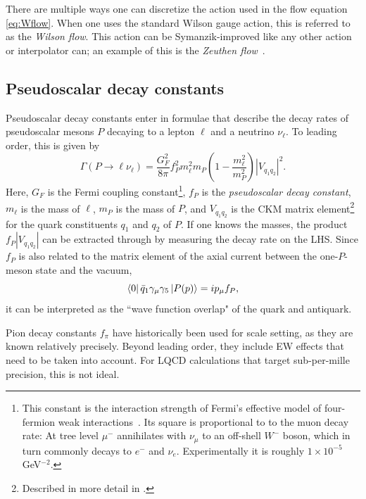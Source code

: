 There are multiple ways one can discretize the action used in the flow equation
\eqref{eq:Wflow}. When one uses the standard Wilson gauge action, this is referred
to as the {\it Wilson flow}. This action can be 
Symanzik-improved like any other action or interpolator can; an example of this is 
the {\it Zeuthen flow}~\cite{Ramos:2015baa}.

\subsection{Pseudoscalar decay constants}

Pseudoscalar decay constants enter in formulae that describe the decay rates 
of pseudoscalar mesons $P$ decaying to a lepton $\ell$ and a neutrino $\nu_\ell$. 
To leading order, this is given by
\begin{equation}\label{eq:decayconstant}
\Gamma(P\to\ell\nu_\ell)=\frac{G_F^2}{8\pi}f_P^2m_\ell^2m_P
\left(1-\frac{m_\ell^2}{m_P^2}\right)|V_{q_1q_2}|^2.
\end{equation}
Here, $G_F$ is the Fermi coupling constant\footnote{This constant is the
interaction strength of Fermi's effective model of four-fermion weak
interactions~\cite{fermi_tentativo_1934}. Its square is proportional to
to the muon decay rate: At tree level $\mu^-$ annihilates with $\nu_\mu$
to an off-shell $W^-$ boson, which in turn commonly decays to
$e^-$ and $\nu_e$. Experimentally it is roughly $1\times10^{-5}$ GeV$^{-2}$.},
$f_P$ is the {\it pseudoscalar decay constant},
$m_\ell$ is the mass of $\ell$, $m_P$ is the mass of $P$,
and $V_{q_1q_2}$ is the CKM matrix element\footnote{Described in
more detail in .} for the quark constituents
$q_1$ and $q_2$ of $P$. If one knows the masses, the product
$f_P|V_{q_1q_2}|$ can be extracted through  by
measuring the decay rate on the LHS.
Since $f_P$ is also related to the matrix element of the
axial current between the one-$P$-meson state and the vacuum,
\begin{equation}
\bra{0}\bar{q}_1\gamma_\mu\gamma_5\ket{P(p)}=ip_\mu f_P,
\end{equation}
it can be interpreted as the ``wave function overlap" of the quark and
antiquark. 

Pion decay constants $f_\pi$ have historically been used for scale setting, as
they are known relatively precisely. Beyond leading order, they include
EW effects that need to be taken into account. For LQCD calculations
that target sub-per-mille precision, this is not ideal.

